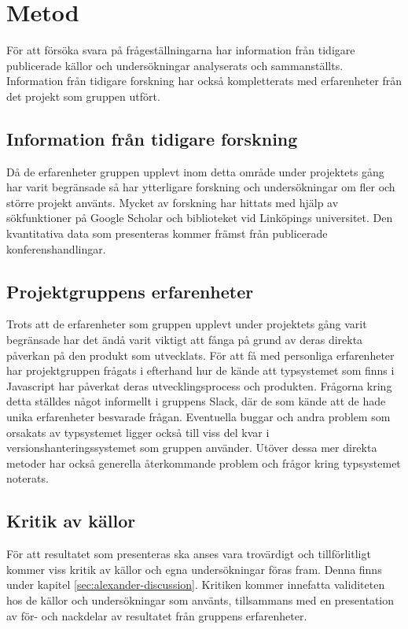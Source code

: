 \section{Metod}
\label{sec:alexander-method}

För att försöka svara på frågeställningarna har information från tidigare publicerade källor och undersökningar analyserats och sammanställts. Information från tidigare forskning har också kompletterats med erfarenheter från det projekt som gruppen utfört. 

\subsection{Information från tidigare forskning}

Då de erfarenheter gruppen upplevt inom detta område under projektets gång har varit begränsade så har ytterligare forskning och undersökningar om fler och större projekt använts. Mycket av forskning har hittats med hjälp av sökfunktioner på Google Scholar och biblioteket vid Linköpings universitet. Den kvantitativa data som presenteras kommer främst från publicerade konferenshandlingar.

\subsection{Projektgruppens erfarenheter}
Trots att de erfarenheter som gruppen upplevt under projektets gång varit begränsade har det ändå varit viktigt att fånga på grund av deras direkta påverkan på den produkt som utvecklats. För att få med personliga erfarenheter har projektgruppen frågats i efterhand hur de kände att typsystemet som finns i Javascript har påverkat deras utvecklingsprocess och produkten. Frågorna kring detta ställdes något informellt i gruppens Slack, där de som kände att de hade unika erfarenheter besvarade frågan. Eventuella buggar och andra problem som orsakats av typsystemet ligger också till viss del kvar i versionshanteringssystemet som gruppen använder. Utöver dessa mer direkta metoder har också generella återkommande problem och frågor kring typsystemet noterats.

\subsection{Kritik av källor}
För att resultatet som presenteras ska anses vara trovärdigt och tillförlitligt kommer viss kritik av källor och egna undersökningar föras fram. Denna finns under kapitel \ref{sec:alexander-discussion}. Kritiken kommer innefatta validiteten hos de källor och undersökningar som använts, tillsammans med en presentation av för- och nackdelar av resultatet från gruppens erfarenheter. 